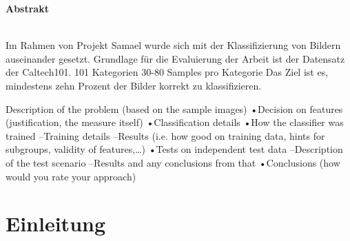 \documentclass[liststotoc,11pt,a4paper]{article}
\begin{document}
\thispagestyle{empty}
\newpage
\setcounter{page}{1}
\tableofcontents                %
\newpage

\normal
\Large \bfseries Abstrakt\\
\normalsize \mdseries
{}
\\Im Rahmen von Projekt Samael wurde sich mit der Klassifizierung von Bildern auseinander gesetzt. Grundlage für die Evaluierung der Arbeit ist der Datensatz der Caltech101. 
101 Kategorien
30-80 Samples pro Kategorie
Das Ziel ist es, mindestens zehn Prozent der Bilder korrekt zu klassifizieren.


Description of the problem (based on the sample images)
•Decision on features (justification, the measure itself)
•Classification details
•How the classifier was trained
–Training details
–Results (i.e. how good on training data, hints for subgroups, validity of features,…)
•Tests on independent test data
–Description of the test scenario
–Results and any conclusions from that
•Conclusions (how would you rate your approach)
\section{Einleitung}
\label{firstSec}

\newline 
\normalfont

\newpage
{}	%
\setcounter{page}{6}
\renewcommand{\refname}{Referenzen}


\end{document}
